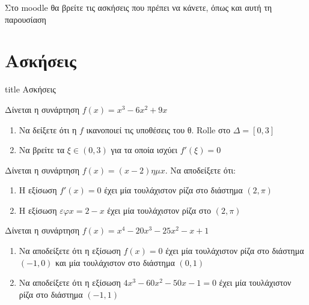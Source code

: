 \documentclass{presentation}
\begin{document}
\begin{frame}[noframenumbering]
    Στο moodle θα βρείτε τις ασκήσεις που πρέπει να κάνετε, όπως και αυτή τη παρουσίαση
\end{frame}

\section{Ασκήσεις}

\begin{frame}[noframenumbering]
    \vfill
    \centering
    \begin{beamercolorbox}[sep=8pt,center,shadow=true,rounded=true]{title}
        Ασκήσεις
    \end{beamercolorbox}
    \vfill
\end{frame}

\begin{askisi}
    Δίνεται η συνάρτηση $f(x)=x^3-6x^2+9x$
    \begin{enumerate}
        \item<1-> Να δείξετε ότι η $f$ ικανοποιεί τις υποθέσεις του θ. Rolle στο $Δ=[0,3]$
        \item<2-> Να βρείτε τα $ξ\in(0,3)$ για τα οποία ισχύει $f'(ξ)=0$
    \end{enumerate}
\end{askisi}

\begin{askisi}
    Δίνεται η συνάρτηση $f(x)=(x-2)ημx$. Να αποδείξετε ότι:
    \begin{enumerate}
        \item<1-> Η εξίσωση $f'(x)=0$ έχει μία τουλάχιστον ρίζα στο διάστημα $(2,π)$
        \item<2-> Η εξίσωση $εφx=2-x$ έχει μία τουλάχιστον ρίζα στο $(2,π)$
    \end{enumerate}

\end{askisi}

\begin{askisi}
    Δίνεται η συνάρτηση $f(x)=x^4-20x^3-25x^2-x+1$
    \begin{enumerate}
        \item<1-> Να αποδείξετε ότι η εξίσωση $f(x)=0$ έχει μία τουλάχιστον ρίζα στο διάστημα $(-1,0)$ και μία τουλάχιστον στο διάστημα $(0,1)$
        \item<2-> Να αποδείξετε ότι η εξίσωση $4x^3-60x^2-50x-1=0$ έχει μία τουλάχιστον ρίζα στο διάστημα $(-1,1)$
    \end{enumerate}
\end{askisi}
\end{document}
